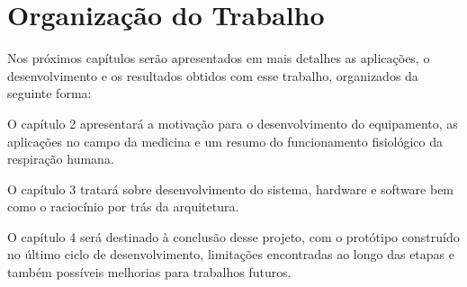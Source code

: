   \section{Organização do Trabalho}
  Nos próximos capítulos serão apresentados em mais detalhes as aplicações, o desenvolvimento e os resultados obtidos com esse trabalho, organizados da seguinte forma:
  
  O capítulo 2 apresentará a motivação para o desenvolvimento do equipamento, as aplicações no campo da medicina e um resumo do funcionamento fisiológico da respiração humana. 
  
  O capítulo 3 tratará sobre desenvolvimento do sistema, hardware e software bem como o raciocínio por trás da arquitetura.
  
  O capítulo 4 será destinado à conclusão desse projeto, com o protótipo construído no último ciclo de desenvolvimento, limitações encontradas ao longo das etapas e também possíveis melhorias para trabalhos futuros.
 